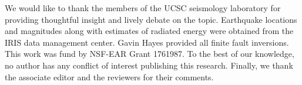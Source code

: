 \documentclass[draft, jgrga]{agujournal2018}
\begin{document}
\acknowledgments
We would like to thank the members of the UCSC seismology laboratory for providing thoughtful insight and lively debate on the topic. Earthquake locations and magnitudes along with estimates of radiated energy were obtained from the IRIS data management center. Gavin Hayes provided all finite fault inversions. This work was fund by NSF-EAR Grant 1761987. To the best of our knowledge, no author has any conflict of interest publishing this research. Finally, we thank the associate editor and the reviewers for their comments.



\end{document}
